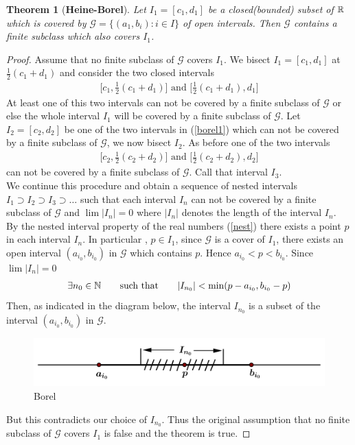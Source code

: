 \documentclass[	DIV=calc,paper=a4,fontsize=11pt]{scrartcl}	 	%
\newtheorem{thm}{Theorem}[section]
\theoremstyle{definition}
\theoremstyle{plain}
\theoremstyle{remark}
\begin{document}
\begin{thm}[\textbf{Heine-Borel}]
Let $I_1=[c_1,d_1]$ be a closed(bounded) subset of $\Bbb R$ which is covered by $\mathcal{G}=\{(a_1,b_i):i\in I\}$ of open intervals. Then $\mathcal{G}$ contains a finite subclass which also covers $I_1$.
\end{thm}
\begin{proof}
Assume that no finite subclass of $\mathcal{G}$ covers $I_1$. We bisect $I_1=[c_1,d_1]$ at $\frac{1}{2}(c_1+d_1)$ and consider the two closed intervals
\begin{align}\label{borel1}
\biggl[c_1, \frac{1}{2}(c_1+d_1)\biggl]\text{ and } \biggl[\frac{1}{2}(c_1+d_1),d_1\biggl]
\end{align}
At least one of this two intervals can not be covered by a finite subclass of $\mathcal{G}$ or else the whole interval $I_1$ will be covered by a finite subclass of $\mathcal{G}$. Let $I_2=[c_2,d_2]$ be one of the two intervals in (\ref{borel1}) which can not be covered by a finite subclass of $\mathcal{G}$, we now bisect $I_2$. As before one of the two intervals
\begin{align*}
\biggl[c_2, \frac{1}{2}(c_2+d_2)\biggl]\text{ and } \biggl[\frac{1}{2}(c_2+d_2),d_2\biggl]
\end{align*}
can not be covered by a finite subclass of $\mathcal{G}$. Call that interval $I_3$.\\
We continue this procedure and obtain a sequence of nested intervals $I_1\supset I_2\supset I_3\supset\ldots$ such that each interval $I_n$ can not be covered by a finite subclass of $\mathcal{G}$ and $\lim |I_n|=0$ where $|I_n|$ denotes the length of the interval $I_n$.\\
By the nested interval property of the real numbers (\ref{nest}) there exists a point $p$ in each interval $I_n$. In particular , $p\in I_1$, since $\mathcal{G}$ is a cover of $I_1$, there exists an open interval $(a_{i_0},b_{i_0})$ in $\mathcal{G}$ which contains $p$. Hence $a_{i_0}<p<b_{i_0}$. Since $\lim |I_n|=0$
\begin{align*}
\exists n_0\in \Bbb N \qquad\text{such that}\qquad |I_{n_0}|<\min(p-a_{i_0},b_{i_0}-p)
\end{align*}
Then, as indicated in the diagram below, the interval $I_{n_0}$ is a subset of the interval $(a_{i_0},b_{i_0})$ in $\mathcal{G}$.
\begin{figure}[hbt!]
\centering
\includegraphics[width=.6\textwidth]{borel.png}
\caption{Borel}
\end{figure}

But this contradicts our choice of $I_{n_0}$. Thus the original assumption that no finite subclass of $\mathcal{G}$ covers $I_1$ is false and the theorem is true.
\end{proof}
\end{document}
